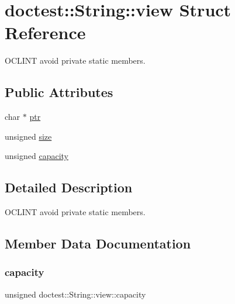\hypertarget{structdoctest_1_1String_1_1view}{}\section{doctest\+:\+:String\+:\+:view Struct Reference}
\label{structdoctest_1_1String_1_1view}


O\+C\+L\+I\+NT avoid private static members.  


\subsection*{Public Attributes}
\begin{DoxyCompactItemize}
\item 
char $\ast$ \hyperlink{structdoctest_1_1String_1_1view_a18a399abb1e4be67bcc6d6557837a98c}{ptr}
\item 
unsigned \hyperlink{structdoctest_1_1String_1_1view_a41d7343e928b0e23c973521aac5b59d3}{size}
\item 
unsigned \hyperlink{structdoctest_1_1String_1_1view_a979de8cef3bce097a5b1f824c901b221}{capacity}
\end{DoxyCompactItemize}


\subsection{Detailed Description}
O\+C\+L\+I\+NT avoid private static members. 

\subsection{Member Data Documentation}
\mbox{\label{structdoctest_1_1String_1_1view_a979de8cef3bce097a5b1f824c901b221}} 
\subsubsection{\texorpdfstring{capacity}{capacity}}
{\footnotesize\ttfamily unsigned doctest\+::\+String\+::view\+::capacity}

\mbox{\label{structdoctest_1_1String_1_1view_a18a399abb1e4be67bcc6d6557837a98c}} 
